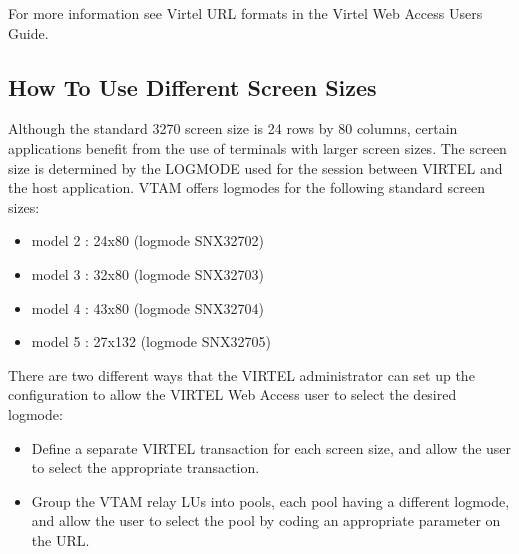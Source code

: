 \documentclass[letterpaper,10pt,english]{sphinxmanual}
\begin{document}


For more information see Virtel URL formats in the Virtel Web Access Users Guide.

\ignorespaces 

\subsection{How To Use Different Screen Sizes}
\label{\detokenize{Customization:how-to-use-different-screen-sizes}}\label{\detokenize{Customization:index-60}}
Although the standard 3270 screen size is 24 rows by 80 columns, certain applications benefit from the use of terminals with larger screen sizes. The screen size is determined by the LOGMODE used for the session between VIRTEL and the host application. VTAM offers logmodes for the following standard screen sizes:
\begin{itemize}
\item {} 
model 2 : 24x80 (logmode SNX32702)

\item {} 
model 3 : 32x80 (logmode SNX32703)

\item {} 
model 4 : 43x80 (logmode SNX32704)

\item {} 
model 5 : 27x132 (logmode SNX32705)

\end{itemize}

There are two different ways that the VIRTEL administrator can set up the configuration to allow the VIRTEL Web Access user to select the desired logmode:
\begin{itemize}
\item {} 
Define a separate VIRTEL transaction for each screen size, and allow the user to select the appropriate transaction.

\item {} 
Group the VTAM relay LUs into pools, each pool having a different logmode, and allow the user to select the pool by coding an appropriate parameter on the URL.

\end{itemize}
\end{document}
